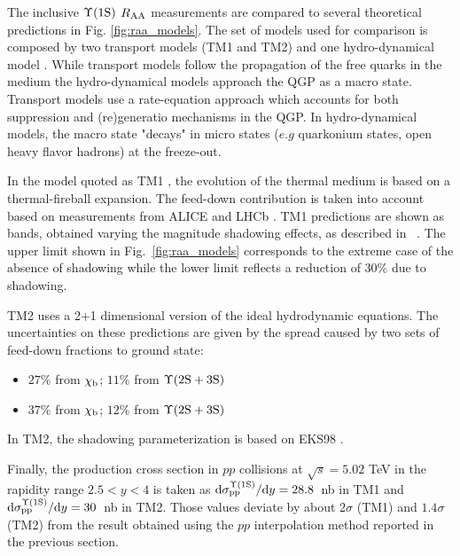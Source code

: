 The inclusive $\mbox{$\Upsilon$(1S)}$ $\mbox{$R_{\rm{AA}}$}$ measurements are compared to several theoretical predictions in Fig. \ref{fig:raa_models}.
The set of models used for comparison is composed by two transport models (TM1 and TM2)\cite{Du:2017qkv,Zhou:2014hwa} and one hydro-dynamical model \cite{Krouppa:2017jlg}.
While transport models follow the propagation of the free quarks in the medium the hydro-dynamical models approach the QGP as a macro state.
Transport models use a rate-equation approach which accounts for both suppression and (re)generatio mechanisms in the QGP.
In hydro-dynamical models, the macro state "decays" in micro states ($e.g$ quarkonium states, open heavy flavor hadrons) at the freeze-out.

In the model quoted as TM1 \cite{Du:2017qkv}, the evolution of the thermal medium is based on a thermal-fireball expansion.
The feed-down contribution is taken into account based on measurements from ALICE and LHCb \cite{Abelev:2014qha,Aaij:2014caa,Aaij:2014hla}.
TM1 predictions are shown as bands, obtained varying the magnitude shadowing effects, as described in ~\cite{Tuchin:2010pv}. 
The upper limit shown in Fig.~\ref{fig:raa_models} corresponds to the extreme case of the absence of shadowing while the lower limit reflects a reduction of $30\%$ due to shadowing.

TM2 \cite{Zhou:2014hwa} uses a 2+1 dimensional version of the ideal hydrodynamic equations.
The uncertainties on these predictions are given by the spread caused by two sets of feed-down fractions to \upsis ground state:
\begin{itemize}
\item $27\%$ from $\chi_{\rm b}$; $11\%$ from $\Upsilon({\rm 2S}+{\rm 3S})$
\item $37\%$ from $\chi_{\rm b}$; $12\%$ from $\Upsilon({\rm 2S}+{\rm 3S})$
\end{itemize}
In TM2, the shadowing parameterization is based on EKS98 \cite{Eskola:1998df}.

Finally, the \upsis production cross section in $pp$ collisions at $\sqrt{s}=5.02$ \rm{TeV} in the rapidity range $2.5 < y < 4$ is taken as $\text{d}\sigma^{\rm\Upsilon({\rm 1S})}_{\rm pp}/\text{d}y=28.8$~nb in TM1 and $\text{d}\sigma^{\rm\Upsilon({\rm 1S})}_{\rm pp}/\text{d}y=30$~nb in TM2.
Those values deviate by about $2 \sigma$ (TM1) and $1.4 \sigma$ (TM2) from the result obtained using the $pp$ interpolation method reported in the previous section.

